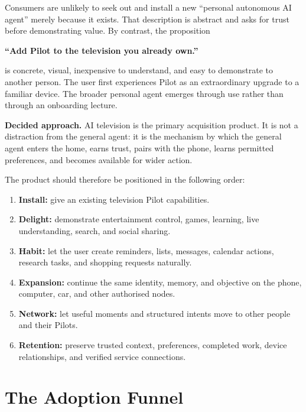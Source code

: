 \documentclass[11pt,a4paper]{article}
\newcommand{\decision}[1]{\par\medskip\noindent\colorbox{pilotblue!9}{\parbox{0.95\linewidth}{\textbf{Decided approach.} #1}}\par\medskip}
\begin{document}
Consumers are unlikely to seek out and install a new ``personal autonomous AI
agent'' merely because it exists.  That description is abstract and asks for
trust before demonstrating value.  By contrast, the proposition

\begin{center}
\Large\textbf{``Add Pilot to the television you already own.''}
\end{center}

is concrete, visual, inexpensive to understand, and easy to demonstrate to
another person.  The user first experiences Pilot as an extraordinary upgrade
to a familiar device.  The broader personal agent emerges through use rather
than through an onboarding lecture.

\decision{AI television is the primary acquisition product.  It is not a
distraction from the general agent: it is the mechanism by which the general
agent enters the home, earns trust, pairs with the phone, learns permitted
preferences, and becomes available for wider action.}

The product should therefore be positioned in the following order:

\begin{enumerate}[leftmargin=*]
  \item \textbf{Install:} give an existing television Pilot capabilities.
  \item \textbf{Delight:} demonstrate entertainment control, games, learning,
        live understanding, search, and social sharing.
  \item \textbf{Habit:} let the user create reminders, lists, messages,
        calendar actions, research tasks, and shopping requests naturally.
  \item \textbf{Expansion:} continue the same identity, memory, and objective
        on the phone, computer, car, and other authorised nodes.
  \item \textbf{Network:} let useful moments and structured intents move to
        other people and their Pilots.
  \item \textbf{Retention:} preserve trusted context, preferences, completed
        work, device relationships, and verified service connections.
\end{enumerate}

\section{The Adoption Funnel}
\end{document}
